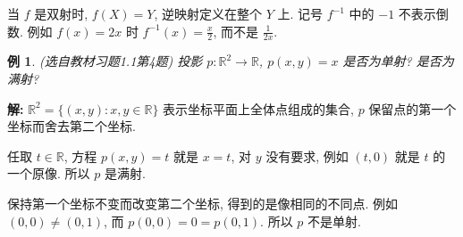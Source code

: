 \documentclass[UTF8,openany]{ctexbook}
\theoremstyle{chinesetextbook}
\newtheorem{example}{例}[section]
\newenvironment{cnsolution}{\par\indent\textbf{解:} \ignorespaces}{\par}
\begin{document}
当 $f$ 是双射时, $f(X)=Y$, 逆映射定义在整个 $Y$ 上. 记号 $f^{-1}$ 中的 $-1$ 不表示倒数. 例如 $f(x)=2x$ 时 $\displaystyle f^{-1}(x)=\frac x2$, 而不是 $\displaystyle\frac1{2x}$.
\begin{example}
\textnormal{(选自教材习题1.1第4题)} 投影 $p:\mathbb R^2\to\mathbb R$, $p(x,y)=x$ 是否为单射? 是否为满射?
\end{example}
\begin{cnsolution}
$\mathbb R^2=\{(x,y):x,y\in\mathbb R\}$ 表示坐标平面上全体点组成的集合, $p$ 保留点的第一个坐标而舍去第二个坐标.

任取 $t\in\mathbb R$, 方程 $p(x,y)=t$ 就是 $x=t$, 对 $y$ 没有要求, 例如 $(t,0)$ 就是 $t$ 的一个原像. 所以 $p$ 是满射.

保持第一个坐标不变而改变第二个坐标, 得到的是像相同的不同点. 例如 $(0,0)\ne(0,1)$, 而 $p(0,0)=0=p(0,1)$. 所以 $p$ 不是单射.
\end{cnsolution}
\end{document}
